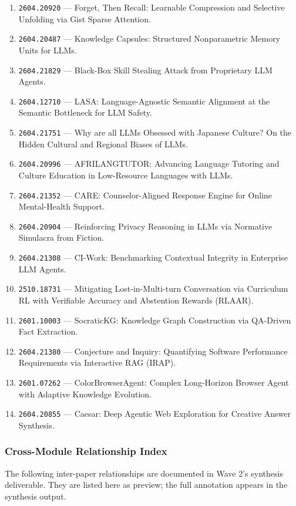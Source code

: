 \documentclass[11pt,letterpaper]{article}
\newcommand{\arxivid}[1]{\texttt{\textcolor{accent}{#1}}}
\begin{document}
\begin{enumerate}[leftmargin=*]
\item \arxivid{2604.20920} --- Forget, Then Recall: Learnable Compression and Selective Unfolding via Gist Sparse Attention.
\item \arxivid{2604.20487} --- Knowledge Capsules: Structured Nonparametric Memory Units for LLMs.
\item \arxivid{2604.21829} --- Black-Box Skill Stealing Attack from Proprietary LLM Agents.
\item \arxivid{2604.12710} --- LASA: Language-Agnostic Semantic Alignment at the Semantic Bottleneck for LLM Safety.
\item \arxivid{2604.21751} --- Why are all LLMs Obsessed with Japanese Culture? On the Hidden Cultural and Regional Biases of LLMs.
\item \arxivid{2604.20996} --- AFRILANGTUTOR: Advancing Language Tutoring and Culture Education in Low-Resource Languages with LLMs.
\item \arxivid{2604.21352} --- CARE: Counselor-Aligned Response Engine for Online Mental-Health Support.
\item \arxivid{2604.20904} --- Reinforcing Privacy Reasoning in LLMs via Normative Simulacra from Fiction.
\item \arxivid{2604.21308} --- CI-Work: Benchmarking Contextual Integrity in Enterprise LLM Agents.
\item \arxivid{2510.18731} --- Mitigating Lost-in-Multi-turn Conversation via Curriculum RL with Verifiable Accuracy and Abstention Rewards (RLAAR).
\item \arxivid{2601.10003} --- SocraticKG: Knowledge Graph Construction via QA-Driven Fact Extraction.
\item \arxivid{2604.21380} --- Conjecture and Inquiry: Quantifying Software Performance Requirements via Interactive RAG (IRAP).
\item \arxivid{2601.07262} --- ColorBrowserAgent: Complex Long-Horizon Browser Agent with Adaptive Knowledge Evolution.
\item \arxivid{2604.20855} --- Caesar: Deep Agentic Web Exploration for Creative Answer Synthesis.
\end{enumerate}

\subsubsection{Cross-Module Relationship Index}

The following inter-paper relationships are documented in Wave 2's synthesis deliverable. They are listed here as preview; the full annotation appears in the synthesis output.
\end{document}
